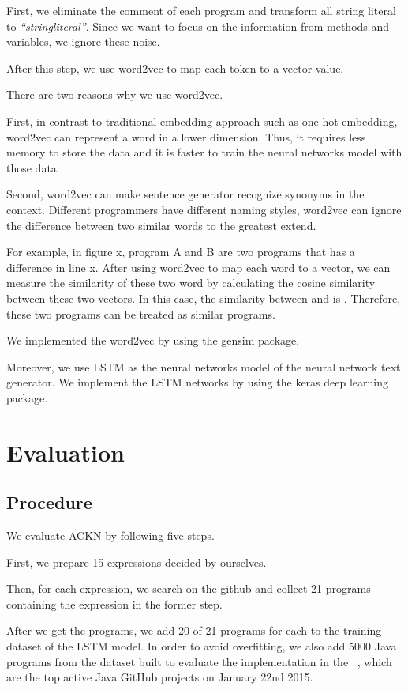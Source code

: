 \documentclass[PRO,english]{ipsj}
\begin{document}
First, we eliminate the comment of each program and transform all string literal to \textit{``stringliteral''}. Since we want to focus on the information from methods and variables, we ignore these noise.

After this step, we use word2vec to map each token to a vector value. 

There are two reasons why we use word2vec. 

First, in contrast to traditional embedding approach such as one-hot embedding, word2vec can represent a word in a lower dimension. Thus, it requires less memory to store the data and it is faster to train the neural networks model with those data. 

Second, word2vec can make sentence generator recognize synonyms in the context. Different programmers have different naming styles, word2vec can ignore the difference between two similar words to the greatest extend. 

For example, in figure x, program A and B are two programs that has a difference in line x. After using word2vec to map each word to a vector, we can measure the similarity of these two word by calculating the cosine similarity between these two vectors. In this case, the similarity between \texttt{} and \texttt{} is . Therefore, these two programs can be treated as similar programs.

We implemented the word2vec by using the gensim package.

Moreover, we use LSTM as the neural networks model of the neural network text generator. We implement the LSTM networks by using the keras deep learning package.

\section{Evaluation}
\subsection{Procedure}
We evaluate ACKN by following five steps. 

First, we prepare 15 expressions decided by ourselves. 

Then, for each expression, we search on the github and collect 21 programs containing the expression in the former step.

After we get the programs, we add 20 of 21 programs for each to the training dataset of the LSTM model. In order to avoid overfitting, we also add 5000 Java programs from the dataset built to evaluate the implementation in the ~\cite{Dataset}, which are the top active Java GitHub projects on January 22nd 2015.
\end{document}

